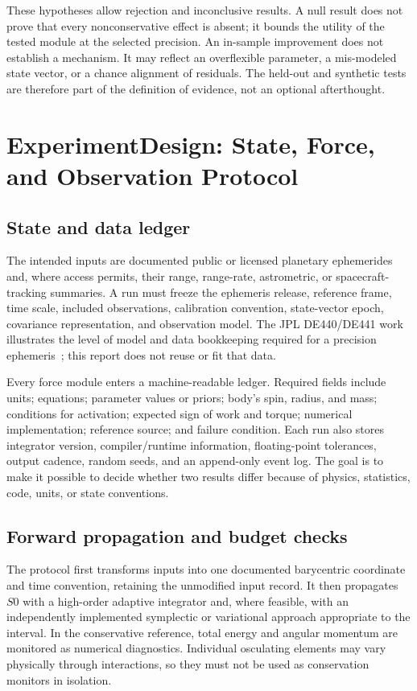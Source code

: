 \documentclass[10pt,conference]{IEEEtran}
\begin{document}
These hypotheses allow rejection and inconclusive results. A null result does not prove that every nonconservative effect is absent; it bounds the utility of the tested module at the selected precision. An in-sample improvement does not establish a mechanism. It may reflect an overflexible parameter, a mis-modeled state vector, or a chance alignment of residuals. The held-out and synthetic tests are therefore part of the definition of evidence, not an optional afterthought.

\section{ExperimentDesign: State, Force, and Observation Protocol}
\label{sec:experiment-design}

\subsection{State and data ledger}

The intended inputs are documented public or licensed planetary ephemerides and, where access permits, their range, range-rate, astrometric, or spacecraft-tracking summaries. A run must freeze the ephemeris release, reference frame, time scale, included observations, calibration convention, state-vector epoch, covariance representation, and observation model. The JPL DE440/DE441 work illustrates the level of model and data bookkeeping required for a precision ephemeris~\cite{park2021}; this report does not reuse or fit that data.

Every force module enters a machine-readable ledger. Required fields include units; equations; parameter values or priors; body's spin, radius, and mass; conditions for activation; expected sign of work and torque; numerical implementation; reference source; and failure condition. Each run also stores integrator version, compiler/runtime information, floating-point tolerances, output cadence, random seeds, and an append-only event log. The goal is to make it possible to decide whether two results differ because of physics, statistics, code, units, or state conventions.

\subsection{Forward propagation and budget checks}

The protocol first transforms inputs into one documented barycentric coordinate and time convention, retaining the unmodified input record. It then propagates $S0$ with a high-order adaptive integrator and, where feasible, with an independently implemented symplectic or variational approach appropriate to the interval. In the conservative reference, total energy and angular momentum are monitored as numerical diagnostics. Individual osculating elements may vary physically through interactions, so they must not be used as conservation monitors in isolation.
\end{document}
